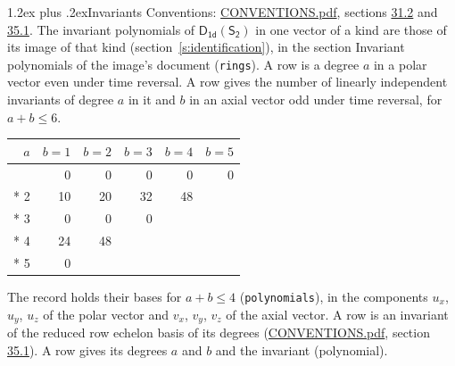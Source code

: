 \documentclass[10pt,a4paper]{article}
\makeatletter
\renewcommand\section{\@startsection{section}{1}{\z@}{-3ex plus -1ex minus -.2ex}%
  {1.2ex plus .2ex}{\normalfont\large\sffamily\bfseries\color{parttitle}}}
\numberwithin{equation}{section}
\newcommand{\grp}[1]{\mathsf{#1}}
\makeatother
\begin{document}
\section{Invariants}\label{s:invariants}
Conventions: \href{../../CONVENTIONS.pdf}{CONVENTIONS.pdf}, sections \href{../../CONVENTIONS.pdf\#conv.31.2}{31.2} and \href{../../CONVENTIONS.pdf\#conv.35.1}{35.1}.
The invariant polynomials of $\grp{D_{1d}}(\grp{S_{2}})$ in one vector of a kind are those of its image of that kind (section~\ref{s:identification}), in the section Invariant polynomials of the image's document (\texttt{rings}).
\leavevmode\label{n:index.degree.polar}\label{n:index.degree.axial}A row is a degree $a$ in a polar vector even under time reversal. A row gives the number of linearly independent invariants of degree $a$ in it and $b$ in an axial vector odd under time reversal, for $a + b \le 6$.
{\small\begin{longtable}{@{}rrrrrr@{}}\toprule
$a$ & $b = 1$ & $b = 2$ & $b = 3$ & $b = 4$ & $b = 5$\\\midrule\endhead
\bottomrule\endfoot\endlastfoot
1 & 0 & 0 & 0 & 0 & 0\\*
2 & 10 & 20 & 32 & 48 & \\*
3 & 0 & 0 & 0 &  & \\*
4 & 24 & 48 &  &  & \\*
5 & 0 &  &  &  & \\
\bottomrule\end{longtable}}
\leavevmode\label{n:local.component.polar}\label{n:local.component.axial}The record holds their bases for $a + b \le 4$ (\texttt{polynomials}), in the components $u_{x}$, $u_{y}$, $u_{z}$ of the polar vector and $v_{x}$, $v_{y}$, $v_{z}$ of the axial vector. \label{n:head.polynomial}A row is an invariant of the reduced row echelon basis of its degrees (\href{../../CONVENTIONS.pdf}{CONVENTIONS.pdf}, section \href{../../CONVENTIONS.pdf\#conv.35.1}{35.1}). A row gives its degrees $a$ and $b$ and the invariant (polynomial).
\end{document}
